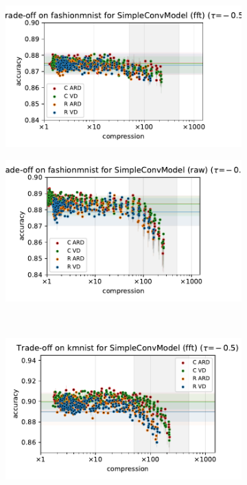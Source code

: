 \documentclass[a4paper,10pt,onecolumn]{article}
\begin{document}
\begin{figure}[b]
\begin{subfigure}[b]{0.5\columnwidth}
    \includegraphics[width=\columnwidth]{figure__mnist-like__method_comparison/appendix__SimpleConvModel__fashionmnist__fft__-0.5.pdf}
  \end{subfigure}%
  \begin{subfigure}[b]{0.5\columnwidth}
    \centering
    \includegraphics[width=\columnwidth]{figure__mnist-like__method_comparison/appendix__SimpleConvModel__fashionmnist__raw__-0.5.pdf}
  \end{subfigure} \\ %
  \begin{subfigure}[b]{0.5\columnwidth}
    \centering
    \includegraphics[width=\columnwidth]{figure__mnist-like__method_comparison/appendix__SimpleConvModel__kmnist__fft__-0.5.pdf}

\end{subfigure}
\end{figure}
\end{document}
